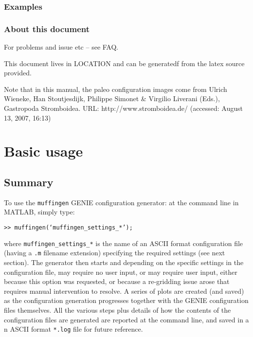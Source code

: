 \documentclass[11pt,fleqn]{book} %
\begin{document}

\subsection{Examples}



\subsection{About this document}


For problems and issue etc -- see FAQ.

This document lives in LOCATION and can be generatedf from the latex source provided.

Note that in this manual, the paleo configuration images come from 
Ulrich Wieneke, Han Stoutjesdijk, Philippe Simonet \& Virgilio Liverani (Eds.), Gastropoda Stromboidea. URL: http://www.stromboidea.de/ (accessed: August 13, 2007, 16:13)



\chapter{Basic usage}


\section{Summary}

To use the \texttt{muffingen} GENIE configuration generator: at the command line in MATLAB, simply type:

\texttt{>> muffingen(`muffingen\_settings\_*');}

\noindent where \texttt{muffingen\_settings\_*} is the name of an ASCII format configuration file (having a \texttt{.m} filename extension) specifying the required settings (see next section). The generator then starts and depending on the specific settings in the configuration file, may require no user input, or may require user input, either because this option was requested, or because a re-gridding issue arose that requires manual intervention to resolve. A series of plots are created (and saved) as the configuration generation progresses together with the GENIE configuration files themselves. All the various steps plus details of how the contents of the configuration files are generated are reported at the command line, and saved in a n ASCII format \texttt{*.log} file for future reference.
\end{document}
